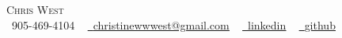 \documentclass[letterpaper,11pt]{article}
\newcommand{\resumeSubHeadingListStart}{\begin{itemize}[leftmargin=0.0in, label={}]}
\newcommand{\resumeSubHeadingListEnd}{\end{itemize}}
\begin{document}

\begin{center}
    {\Huge \scshape Chris West} \\ %
    \small \raisebox{-0.1\height}\faPhone\ 905-469-4104 ~ \href{mailto:christinewwwest@gmail.com}{\raisebox{-0.2\height}\faEnvelope\  \underline{christinewwwest@gmail.com}} ~ 
    \href{https://https://www.linkedin.com/in/chris-west-code-wrangler///}{\raisebox{-0.2\height}\faLinkedin\ \underline{linkedin}}  ~
    \href{https://https://github.com/Westc13/}{\raisebox{-0.2\height}\faGithub\ \underline{github}}
    \vspace{-8pt}
\end{center}



\end{document}
